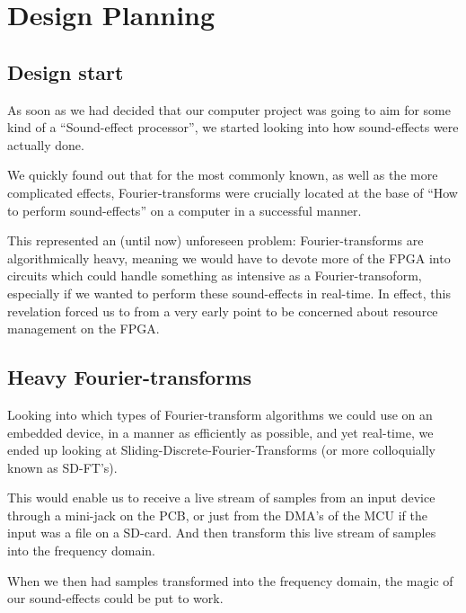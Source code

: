 \FloatBarrier
\section{Design Planning}\label{section:fpga-design}
\FloatBarrier
\subsection{Design start}

As soon as we had decided that our computer project was going to aim for some
kind of a ``Sound-effect processor'', we started looking into how sound-effects
were actually done.

We quickly found out that for the most commonly known, as well as the more
complicated effects, Fourier-transforms were crucially located at the base of
``How to perform sound-effects'' on a computer in a successful manner.

This represented an (until now) unforeseen problem: Fourier-transforms are
algorithmically heavy, meaning we would have to devote more of the FPGA into
circuits which could handle something as intensive as a Fourier-transoform,
especially if we wanted to perform these sound-effects in real-time. In effect,
this revelation forced us to from a very early point to be concerned about
resource management on the FPGA.

\FloatBarrier
\subsection{Heavy Fourier-transforms}

Looking into which types of Fourier-transform algorithms we could use on an
embedded device, in a manner as efficiently as possible, and yet real-time,
we ended up looking at 
Sliding-Discrete-Fourier-Transforms (or more colloquially known as SD-FT's).

This would enable us to receive a live stream of samples from an input device
through a mini-jack on the PCB, or just from the DMA's of the MCU if the input
was a file on a SD-card. And then transform this live stream of samples into
the frequency domain.

When we then had samples transformed into the frequency domain, the magic
of our sound-effects could be put to work.

\FloatBarrier
